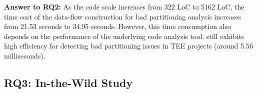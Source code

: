 \begin{tcolorbox} [colback=gray!20!white]
\textbf{Answer to RQ2:}
As the code scale increases from 322 LoC to 5162 LoC, the time cost of the data-flow construction for bad partitioning analysis increases from 21.53 seconds to 34.95 seconds.
However, this time consumption also depends on the performance of the underlying code analysis tool.
\ccSysName still exhibits high efficiency for detecting bad partitioning issues in TEE projects (around 5.56 milliseconds).
\end{tcolorbox}

\subsection{RQ3: In-the-Wild Study}

